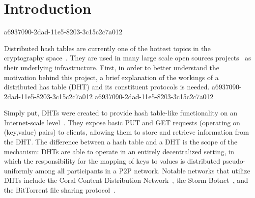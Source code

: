 \documentclass[12pt]{article}
\begin{document}
\section{Introduction}
a6937090-2dad-11e5-8203-3c15c2c7a012\par Distributed hash tables are currently one of the hottest topics in the cryptography space~\cite{Stoica:2001dj,Rowstron:2001ea,Ratnasamy:2001wn}. They are used in many large scale open sources projects~\cite{Freitas:2013tb,Xu:2010vs,Perfitt:2010fh} as their underlying infrastructure. First, in order to better understand the motivation behind this project, a brief explanation of the workings of a distributed has table (DHT) and its constituent protocols is needed.
a6937090-2dad-11e5-8203-3c15c2c7a012
a6937090-2dad-11e5-8203-3c15c2c7a012\par Simply put, DHTs were created to provide hash table-like functionality on an Internet-scale level~\cite{Ratnasamy:2001wn}. They expose basic PUT and GET requests (operating on (key,value) pairs) to clients, allowing them to store and retrieve information from the DHT. The difference between a hash table and a DHT is the scope of the mechanism: DHTs are able to operate in an entirely decentralized setting, in which the responsibility for the mapping of keys to values is distributed pseudo-uniformly among all participants in a P2P network. Notable networks that utilize DHTs include the Coral Content Distribution Network~\cite{Freedman:2004vb}, the Storm Botnet~\cite{Holz:2008uk}, and the BitTorrent file sharing protocol~\cite{Cohen:y1_8mBnw}.
\end{document}
